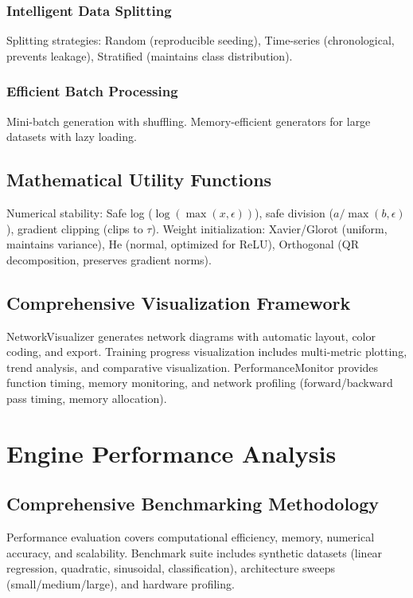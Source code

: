 \documentclass[11pt,a4paper]{report}
\begin{document}
\subsubsection{Intelligent Data Splitting}

Splitting strategies: Random (reproducible seeding), Time-series (chronological, prevents leakage), Stratified (maintains class distribution).

\subsubsection{Efficient Batch Processing}

Mini-batch generation with shuffling. Memory-efficient generators for large datasets with lazy loading.

\subsection{Mathematical Utility Functions}

Numerical stability: Safe log ($\log(\max(x, \epsilon))$), safe division ($a/\max(b, \epsilon)$), gradient clipping (clips to $\tau$). Weight initialization: Xavier/Glorot (uniform, maintains variance), He (normal, optimized for ReLU), Orthogonal (QR decomposition, preserves gradient norms).

\subsection{Comprehensive Visualization Framework}

NetworkVisualizer generates network diagrams with automatic layout, color coding, and export. Training progress visualization includes multi-metric plotting, trend analysis, and comparative visualization. PerformanceMonitor provides function timing, memory monitoring, and network profiling (forward/backward pass timing, memory allocation).

\section{Engine Performance Analysis}

\subsection{Comprehensive Benchmarking Methodology}

Performance evaluation covers computational efficiency, memory, numerical accuracy, and scalability. Benchmark suite includes synthetic datasets (linear regression, quadratic, sinusoidal, classification), architecture sweeps (small/medium/large), and hardware profiling.
\end{document}
